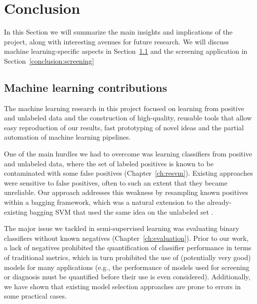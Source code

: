 \chapter{Conclusion}\label{ch:conclusion}

In this Section we will summarize the main insights and implications of the project, along with interesting avenues for future research. We will discuss machine learning-specific aspects in Section~\ref{conclusion:ml} and the screening application in Section~\ref{conclusion:screening}


\section{Machine learning contributions} \label{conclusion:ml}
The machine learning research in this project focused on learning from positive and unlabeled data and the construction of high-quality, reusable tools that allow easy reproduction of our results, fast prototyping of novel ideas and the partial automation of machine learning pipelines.

One of the main hurdles we had to overcome was learning classifiers from positive and unlabeled data, where the set of labeled positives is known to be contaminated with some false positives (Chapter~\ref{ch:resvm}). Existing approaches were sensitive to false positives, often to such an extent that they became unreliable. Our approach addresses this weakness by resampling known positives within a bagging framework, which was a natural extension to the already-existing bagging SVM that used the same idea on the unlabeled set \citep{mordelet2014bagging}.

The major issue we tackled in semi-supervised learning was evaluating binary classifiers without known negatives (Chapter~\ref{ch:evaluation}). Prior to our work, a lack of negatives prohibited the quantification of classifier performance in terms of traditional metrics, which in turn prohibited the use of (potentially very good) models for many applications (e.g., the performance of models used for screening or diagnosis must be quantified before their use is even considered). Additionally, we have shown that existing model selection approaches are prone to errors in some practical cases. 

